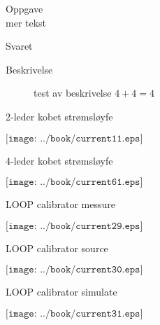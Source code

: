 \documentclass[avery5388,grid,frame]{flashcards}
\begin{document}


\begin{flashcard}{Oppgave \\ mer tekst}

	Svaret

  \smallskip

  \begin{description}
    \item [Beskrivelse]  test av beskrivelse $4+4=4$         
  \end{description}

  \smallskip
  \medskip

\end{flashcard}



\begin{flashcard}{2-leder kobet strømsløyfe}

$\texttt{[image: ../book/current11.eps]}$

\end{flashcard}


\begin{flashcard}{4-leder kobet strømsløyfe}

$\texttt{[image: ../book/current61.eps]}$

\end{flashcard}


\begin{flashcard}{LOOP calibrator messure}

$\texttt{[image: ../book/current29.eps]}$

\end{flashcard}

\begin{flashcard}{LOOP calibrator source}

$\texttt{[image: ../book/current30.eps]}$

\end{flashcard}

\begin{flashcard}{LOOP calibrator simulate}

$\texttt{[image: ../book/current31.eps]}$

\end{flashcard}
\end{document}
